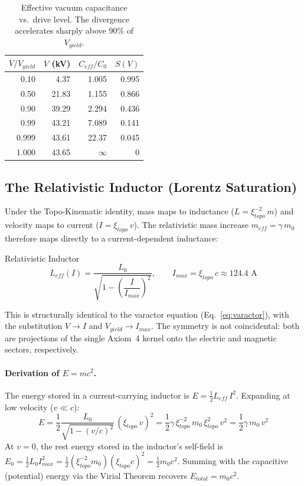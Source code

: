 \begin{table}[H]
\centering
\caption{Effective vacuum capacitance vs.\ drive level. The divergence accelerates sharply above 90\% of $V_{yield}$.}
\label{tab:varactor_values}
\small
\begin{tabular}{@{}r r r r@{}}
\toprule
$V/V_{yield}$ & $V$ (kV) & $C_{eff}/C_0$ & $S(V)$ \\
\midrule
0.10  &  4.37  & 1.005 & 0.995 \\
0.50  & 21.83  & 1.155 & 0.866 \\
0.90  & 39.29  & 2.294 & 0.436 \\
0.99  & 43.21  & 7.089 & 0.141 \\
0.999 & 43.61  & 22.37 & 0.045 \\
1.000 & 43.65  & $\infty$ & 0  \\
\bottomrule
\end{tabular}
\end{table}

\subsection{The Relativistic Inductor (Lorentz Saturation)}

Under the Topo-Kinematic identity, mass maps to inductance ($L = \xi_{topo}^{-2}\, m$) and velocity maps to current ($I = \xi_{topo}\, v$). The relativistic mass increase $m_{eff} = \gamma\, m_0$ therefore maps directly to a current-dependent inductance:
\begin{resultbox}{Relativistic Inductor}
\begin{equation}
    L_{eff}(I) = \frac{L_0}{\sqrt{1 - \left(\dfrac{I}{I_{max}}\right)^{\!2}}}, \qquad I_{max} = \xi_{topo}\, c \approx 124.4 \text{ A}
    \label{eq:relativistic_inductor}
\end{equation}
\end{resultbox}

This is structurally identical to the varactor equation (Eq.~\ref{eq:varactor}), with the substitution $V \to I$ and $V_{yield} \to I_{max}$. The symmetry is not coincidental: both are projections of the single Axiom~4 kernel onto the electric and magnetic sectors, respectively.

\paragraph{Derivation of $E = mc^2$.}
The energy stored in a current-carrying inductor is $E = \tfrac{1}{2} L_{eff}\, I^2$. Expanding at low velocity ($v \ll c$):
\begin{equation}
    E = \frac{1}{2} \frac{L_0}{\sqrt{1-(v/c)^2}}\, (\xi_{topo}\, v)^2 = \frac{1}{2} \gamma\, \xi_{topo}^{-2}\, m_0\, \xi_{topo}^2\, v^2 = \frac{1}{2} \gamma\, m_0\, v^2
\end{equation}
At $v = 0$, the rest energy stored in the inductor's self-field is $E_0 = \tfrac{1}{2} L_0 I_{max}^2 = \tfrac{1}{2} (\xi_{topo}^{-2} m_0)(\xi_{topo} c)^2 = \tfrac{1}{2} m_0 c^2$. Summing with the capacitive (potential) energy via the Virial Theorem recovers $E_{total} = m_0 c^2$.

